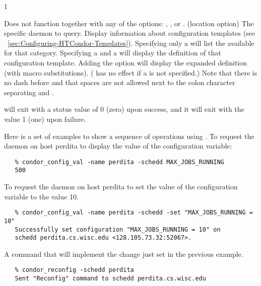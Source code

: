 \begin{ManPage}{\label{man-condor-config-val}}{1}
\begin{Options}
{    Does not function together with any of the options:
    , , or . }
    {(location option) The specific daemon to query. }
    {Display information about configuration templates (see
    ~\ref{sec:Configuring-HTCondor-Templates}).
    Specifying only a  will list the 
    available for that category.
    Specifying a  and a  will display
    the definition of that configuration template.
    Adding the  option will display the expanded
    definition (with macro substitutions).  ( has no
    effect if a  is not specified.)
    Note that there is no dash before  and that spaces are not
    allowed next to the colon character separating 
    and .
    }
    
\end{Options}

\ExitStatus

 will exit with a status value of 0 (zero) upon success,
and it will exit with the value 1 (one) upon failure.

\Examples

Here is a set of examples to show a sequence of operations using 
.
To request the  daemon on host perdita
to display the value of the  configuration variable:
\footnotesize
\begin{verbatim}
   % condor_config_val -name perdita -schedd MAX_JOBS_RUNNING
   500
\end{verbatim}
\normalsize

To request the  daemon on host perdita
to set the value of the  configuration variable
to the value 10.
\footnotesize
\begin{verbatim}
   % condor_config_val -name perdita -schedd -set "MAX_JOBS_RUNNING = 10"
   Successfully set configuration "MAX_JOBS_RUNNING = 10" on 
   schedd perdita.cs.wisc.edu <128.105.73.32:52067>.
\end{verbatim}
\normalsize

A command that will implement the change just set in the previous
example.
\footnotesize
\begin{verbatim}
   % condor_reconfig -schedd perdita
   Sent "Reconfig" command to schedd perdita.cs.wisc.edu
\end{verbatim}
\normalsize


\end{ManPage}
